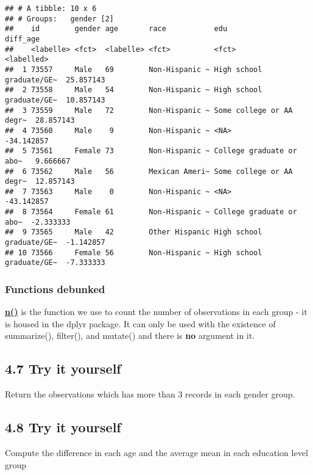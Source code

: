 \documentclass[
]{book}
\begin{document}
\begin{verbatim}
## # A tibble: 10 x 6
## # Groups:   gender [2]
##    id        gender age       race           edu                      diff_age
##    <labelle> <fct>  <labelle> <fct>          <fct>                    <labelled>
##  1 73557     Male   69        Non-Hispanic ~ High school graduate/GE~  25.857143
##  2 73558     Male   54        Non-Hispanic ~ High school graduate/GE~  10.857143
##  3 73559     Male   72        Non-Hispanic ~ Some college or AA degr~  28.857143
##  4 73560     Male    9        Non-Hispanic ~ <NA>                     -34.142857
##  5 73561     Female 73        Non-Hispanic ~ College graduate or abo~   9.666667
##  6 73562     Male   56        Mexican Ameri~ Some college or AA degr~  12.857143
##  7 73563     Male    0        Non-Hispanic ~ <NA>                     -43.142857
##  8 73564     Female 61        Non-Hispanic ~ College graduate or abo~  -2.333333
##  9 73565     Male   42        Other Hispanic High school graduate/GE~  -1.142857
## 10 73566     Female 56        Non-Hispanic ~ High school graduate/GE~  -7.333333
\end{verbatim}

\hypertarget{functions-debunked-16}{%
\subsubsection{Functions debunked}\label{functions-debunked-16}}

\href{https://www.rdocumentation.org/packages/dplyr/versions/0.7.8/topics/n}{\textbf{n()}} is the function we use to count the number of observations in each group - it is housed in the dplyr package. It can only be used with the existence of summarize(), filter(), and mutate() and there is \textbf{no} argument in it.

\hypertarget{try-it-yourself-20}{%
\subsection{4.7 Try it yourself}\label{try-it-yourself-20}}

Return the observations which has more than 3 records in each gender group.

\hypertarget{try-it-yourself-21}{%
\subsection{4.8 Try it yourself}\label{try-it-yourself-21}}

Compute the difference in each age and the average mean in each education level group
\end{document}
